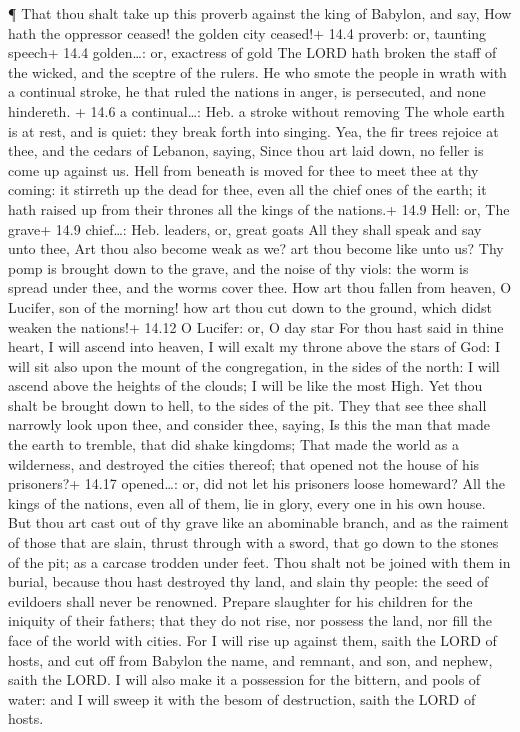  ¶ That thou shalt take up this proverb against the king of
Babylon, and say, How hath the oppressor ceased! the golden city
ceased!+ 14.4 proverb: or, taunting speech+ 14.4 golden\ldots: or,
exactress of gold  The LORD hath broken the staff of the
wicked, and the sceptre of the rulers.  He who smote the
people in wrath with a continual stroke, he that ruled the nations in
anger, is persecuted, and none hindereth. + 14.6 a continual\ldots: Heb.
a stroke without removing  The whole earth is at rest, and
is quiet: they break forth into singing.  Yea, the fir trees
rejoice at thee, and the cedars of Lebanon, saying, Since thou art laid
down, no feller is come up against us.  Hell from beneath is
moved for thee to meet thee at thy coming: it stirreth up the dead for
thee, even all the chief ones of the earth; it hath raised up from their
thrones all the kings of the nations.+ 14.9 Hell: or, The grave+ 14.9
chief\ldots: Heb. leaders, or, great goats  All they shall
speak and say unto thee, Art thou also become weak as we? art thou
become like unto us?  Thy pomp is brought down to the
grave, and the noise of thy viols: the worm is spread under thee, and
the worms cover thee.  How art thou fallen from heaven, O
Lucifer, son of the morning! how art thou cut down to the ground, which
didst weaken the nations!+ 14.12 O Lucifer: or, O day star 
For thou hast said in thine heart, I will ascend into heaven, I will
exalt my throne above the stars of God: I will sit also upon the mount
of the congregation, in the sides of the north:  I will
ascend above the heights of the clouds; I will be like the most High.
 Yet thou shalt be brought down to hell, to the sides of
the pit.  They that see thee shall narrowly look upon thee,
and consider thee, saying, Is this the man that made the earth to
tremble, that did shake kingdoms;  That made the world as a
wilderness, and destroyed the cities thereof; that opened not the house
of his prisoners?+ 14.17 opened\ldots: or, did not let his prisoners
loose homeward?  All the kings of the nations, even all of
them, lie in glory, every one in his own house.  But thou
art cast out of thy grave like an abominable branch, and as the raiment
of those that are slain, thrust through with a sword, that go down to
the stones of the pit; as a carcase trodden under feet. 
Thou shalt not be joined with them in burial, because thou hast
destroyed thy land, and slain thy people: the seed of evildoers shall
never be renowned.  Prepare slaughter for his children for
the iniquity of their fathers; that they do not rise, nor possess the
land, nor fill the face of the world with cities.  For I
will rise up against them, saith the LORD of hosts, and cut off from
Babylon the name, and remnant, and son, and nephew, saith the LORD.
 I will also make it a possession for the bittern, and
pools of water: and I will sweep it with the besom of destruction, saith
the LORD of hosts.

